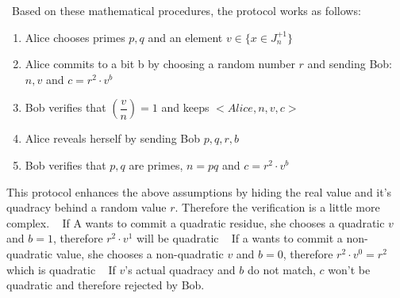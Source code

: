 ~\newline Based on these mathematical procedures, the protocol works as follows:
\begin{enumerate}
	\item Alice chooses primes $p,q$ and an element $v \in \{ x \in J_n^{+1}\}$ 
	\item Alice commits to a bit b by choosing a random number $r$ and sending Bob: $n,v$ and $c = r^2\cdot v^b$
	\item Bob verifies that $(\dfrac{v}{n})=1$ and keeps $<Alice,n,v,c>$
	\item Alice reveals herself by sending Bob $p,q,r,b$
	\item Bob verifies that $p,q$ are primes, $n=pq$ and $c=r^2\cdot v^b$ 
\end{enumerate}
This protocol enhances the above assumptions by hiding the real value and it's quadracy behind a random value $r$. Therefore the verification is a little more complex. 
~\newline
If A wants to commit a quadratic residue, she chooses a quadratic $v$ and $b=1$, therefore $r^2 \cdot v^1$ will be quadratic ~\newline
If a wants to commit a non-quadratic value, she chooses a non-quadratic $v$ and $b=0$, therefore $r^2 \cdot v^0 = r^2$ which is quadratic ~\newline
If $v$'s actual quadracy and $b$ do not match, $c$ won't be quadratic and therefore rejected by Bob. 
